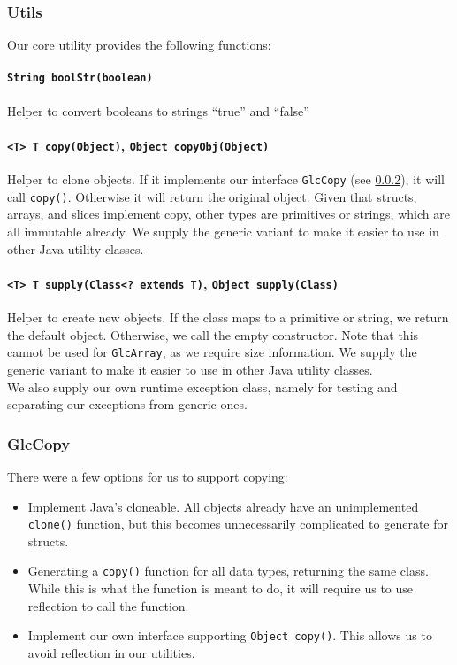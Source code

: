 \documentclass[11pt]{article}
\begin{document}
\subsubsection{Utils}

Our core utility provides the following functions:

\paragraph{\texttt{String boolStr(boolean)}}

Helper to convert booleans to strings ``true'' and ``false''

\paragraph{\texttt{<T> T copy(Object)}, \texttt{Object copyObj(Object)}}

Helper to clone objects. If it implements our interface \texttt{GlcCopy} (see \ref{sec:glccopy}), it will call \texttt{copy()}.
Otherwise it will return the original object.
Given that structs, arrays, and slices implement copy, other types are
primitives or strings, which are all immutable already. We supply the generic variant to make it easier to use in other Java utility classes.

\paragraph{\texttt{<T> T supply(Class<?\ extends T)}, \texttt{Object supply(Class)}}

Helper to create new objects. If the class maps to a primitive or string,
we return the default object. Otherwise, we call the empty constructor.
Note that this cannot be used for \texttt{GlcArray}, as we require size information. We supply the generic variant to make it easier to use in other Java utility classes. \\

\noindent We also supply our own runtime exception class, namely for testing and separating our exceptions from generic ones.

\subsubsection{GlcCopy}
\label{sec:glccopy}

There were a few options for us to support copying:

\begin{itemize}
	\item Implement Java's cloneable. All objects already have an unimplemented \texttt{clone()} function, but this becomes unnecessarily complicated to generate for structs.
	\item Generating a \texttt{copy()} function for all data types, returning the same class. While this is what the function is meant to do, it will require us to use reflection to call the function.
	\item Implement our own interface supporting \texttt{Object copy()}.
	This allows us to avoid reflection in our utilities.
\end{itemize}
\end{document}
